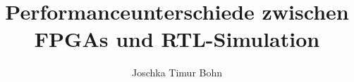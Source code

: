 % 
% 

\newcommand{\graduationlevel}{Bachelor}

\title{Performanceunterschiede zwischen FPGAs und RTL-Simulation}

\author{Joschka Timur Bohn}

\newcommand{\firstreviewer}{Dr. CF Bolz-Tereick}

\newcommand{\secondreviewer}{John Witulski}

\newcommand{\thesissupervisor}{Dr. CF Bolz-Tereick}

\newcommand{\thesissubmissionday}{10}

\newcommand{\thesissubmissionmonth}{08}

\newcommand{\thesissubmissionyear}{2026}

